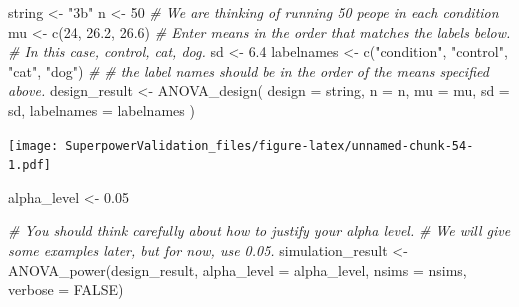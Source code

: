 \documentclass[
]{book}
\newenvironment{Shaded}{\begin{snugshade}}{\end{snugshade}}
\newcommand{\AttributeTok}[1]{\textcolor[rgb]{0.77,0.63,0.00}{#1}}
\newcommand{\CommentTok}[1]{\textcolor[rgb]{0.56,0.35,0.01}{\textit{#1}}}
\newcommand{\ConstantTok}[1]{\textcolor[rgb]{0.00,0.00,0.00}{#1}}
\newcommand{\DecValTok}[1]{\textcolor[rgb]{0.00,0.00,0.81}{#1}}
\newcommand{\FloatTok}[1]{\textcolor[rgb]{0.00,0.00,0.81}{#1}}
\newcommand{\FunctionTok}[1]{\textcolor[rgb]{0.00,0.00,0.00}{#1}}
\newcommand{\NormalTok}[1]{#1}
\newcommand{\OtherTok}[1]{\textcolor[rgb]{0.56,0.35,0.01}{#1}}
\newcommand{\StringTok}[1]{\textcolor[rgb]{0.31,0.60,0.02}{#1}}
\begin{document}
\begin{Shaded}
\begin{Highlighting}[]
\NormalTok{string }\OtherTok{\textless{}{-}} \StringTok{"3b"}
\NormalTok{n }\OtherTok{\textless{}{-}} \DecValTok{50}
\CommentTok{\# We are thinking of running 50 peope in each condition}
\NormalTok{mu }\OtherTok{\textless{}{-}} \FunctionTok{c}\NormalTok{(}\DecValTok{24}\NormalTok{, }\FloatTok{26.2}\NormalTok{, }\FloatTok{26.6}\NormalTok{)}
\CommentTok{\# Enter means in the order that matches the labels below.}
\CommentTok{\# In this case, control, cat, dog.}
\NormalTok{sd }\OtherTok{\textless{}{-}} \FloatTok{6.4}
\NormalTok{labelnames }\OtherTok{\textless{}{-}} \FunctionTok{c}\NormalTok{(}\StringTok{"condition"}\NormalTok{, }\StringTok{"control"}\NormalTok{, }\StringTok{"cat"}\NormalTok{, }\StringTok{"dog"}\NormalTok{) }\CommentTok{\#}
\CommentTok{\# the label names should be in the order of the means specified above.}
\NormalTok{design\_result }\OtherTok{\textless{}{-}} \FunctionTok{ANOVA\_design}\NormalTok{(}
\AttributeTok{design =}\NormalTok{ string,}
\AttributeTok{n =}\NormalTok{ n,}
\AttributeTok{mu =}\NormalTok{ mu,}
\AttributeTok{sd =}\NormalTok{ sd,}
\AttributeTok{labelnames =}\NormalTok{ labelnames}
\NormalTok{)}
\end{Highlighting}
\end{Shaded}

\texttt{[image: SuperpowerValidation\_files/figure-latex/unnamed-chunk-54-1.pdf]}

\begin{Shaded}
\begin{Highlighting}[]
\NormalTok{alpha\_level }\OtherTok{\textless{}{-}} \FloatTok{0.05}
\end{Highlighting}
\end{Shaded}

\begin{Shaded}
\begin{Highlighting}[]
\CommentTok{\# You should think carefully about how to justify your alpha level.}
\CommentTok{\# We will give some examples later, but for now, use 0.05.}
\NormalTok{simulation\_result }\OtherTok{\textless{}{-}} \FunctionTok{ANOVA\_power}\NormalTok{(design\_result,}
                                 \AttributeTok{alpha\_level =}\NormalTok{ alpha\_level,}
                                 \AttributeTok{nsims =}\NormalTok{ nsims,}
                                 \AttributeTok{verbose =} \ConstantTok{FALSE}\NormalTok{)}
\end{Highlighting}
\end{Shaded}
\end{document}
